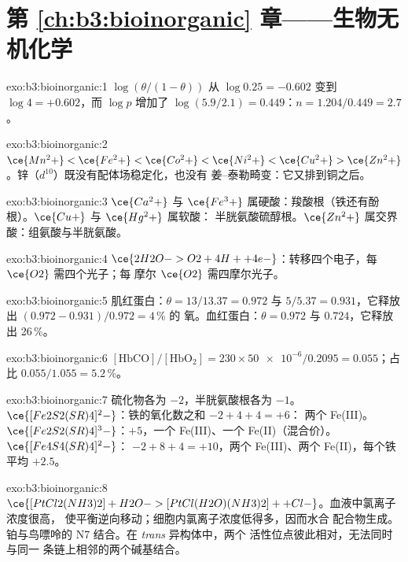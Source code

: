\section*{第 \ref{ch:b3:bioinorganic} 章——生物无机化学}

\begin{solution}{exo:b3:bioinorganic:1}
$\log(\theta/(1 - \theta))$ 从 $\log 0.25 = -0.602$ 变到 $\log 4 = +0.602$，而 $\log p$ 增加了
$\log(5.9/2.1) = 0.449$：$n = 1.204/0.449 = 2.7$。
\end{solution}

\begin{solution}{exo:b3:bioinorganic:2}
$\ce{Mn^2+} < \ce{Fe^2+} < \ce{Co^2+} < \ce{Ni^2+} < \ce{Cu^2+} > \ce{Zn^2+}$。锌（$d^{10}$）既没有配体场稳定化，也没有
姜–泰勒畸变：它又排到铜之后。
\end{solution}

\begin{solution}{exo:b3:bioinorganic:3}
$\ce{Ca^2+}$ 与 $\ce{Fe^3+}$ 属硬酸：羧酸根（铁还有酚根）。$\ce{Cu+}$ 与 $\ce{Hg^2+}$ 属软酸：
半胱氨酸硫醇根。$\ce{Zn^2+}$ 属交界酸：组氨酸与半胱氨酸。
\end{solution}

\begin{solution}{exo:b3:bioinorganic:4}
$\ce{2H2O -> O2 + 4H+ + 4e-}$：转移四个电子，每 $\ce{O2}$ 需四个光子；每
摩尔 $\ce{O2}$ 需四摩尔光子。
\end{solution}

\begin{solution}{exo:b3:bioinorganic:5}
肌红蛋白：$\theta = 13/13.37 = 0.972$ 与 $5/5.37 = 0.931$，它释放出 $(0.972 - 0.931)/0.972 = 4$\,\% 的
氧。血红蛋白：$\theta = 0.972$ 与 $0.724$，它释放出 26\,\%。
\end{solution}

\begin{solution}{exo:b3:bioinorganic:6}
$[\mathrm{HbCO}]/[\mathrm{HbO_2}] = 230 \times \num{50e-6}/0.2095 = 0.055$；占比 $0.055/1.055 = 5.2$\,\%。
\end{solution}

\begin{solution}{exo:b3:bioinorganic:7}
硫化物各为 $-2$，半胱氨酸根各为 $-1$。$\ce{[Fe2S2(SR)4]^2-}$：铁的氧化数之和 $-2 + 4 + 4 = +6$：
两个 Fe(III)。$\ce{[Fe2S2(SR)4]^3-}$：$+5$，一个 Fe(III)、一个 Fe(II)（混合价）。$\ce{[Fe4S4(SR)4]^2-}$：
$-2 + 8 + 4 = +10$，两个 Fe(III)、两个 Fe(II)，每个铁平均 $+2.5$。
\end{solution}

\begin{solution}{exo:b3:bioinorganic:8}
$\ce{[PtCl2(NH3)2] + H2O -> [PtCl(H2O)(NH3)2]+ + Cl-}$。血液中氯离子浓度很高，
使平衡逆向移动；细胞内氯离子浓度低得多，因而水合
配合物生成。铂与鸟嘌呤的 N7 结合。在 \textit{trans} 异构体中，两个
活性位点彼此相对，无法同时与同一
条链上相邻的两个碱基结合。
\end{solution}

